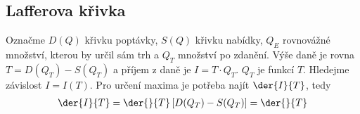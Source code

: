 \subsection*{Lafferova křivka}

Označme $D(Q)$ křivku poptávky, $S(Q)$ křivku nabídky, $Q_E$ rovnovážné množství, kterou by určil sám trh a $Q_T$ množství po zdanění.
Výše daně je rovna $T = D(Q_T) - S(Q_T)$ a příjem z daně je $I = T \cdot Q_T$. $Q_T$ je funkcí $T$. Hledejme závislost $I=I(T)$.
Pro určení maxima je potřeba najít $\der{I}{T}$, tedy \begin{align}
    \der{I}{T} = \der{}{T} \left[ D(Q_T) - S(Q_T) \right] = \der{}{T}
\end{align} 